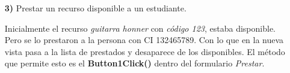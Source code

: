 \documentclass[12pt]{article}
\begin{document}
\begin{itemize}
\newpage
\item[\textbf{3)}] Prestar un recurso disponible a un estudiante.
\begin{center}
\end{center}
Inicialmente el recurso  \textit{guitarra honner} con \textit{código 123}, estaba disponible. Pero se lo prestaron a la persona con CI 132465789.  Con lo que en la nueva vista pasa a la lista de prestados y desaparece de los disponibles.  El método que permite esto es el \textbf{Button1Click()} dentro del formulario \textit{Prestar}. 



\end{itemize}
\end{document}

